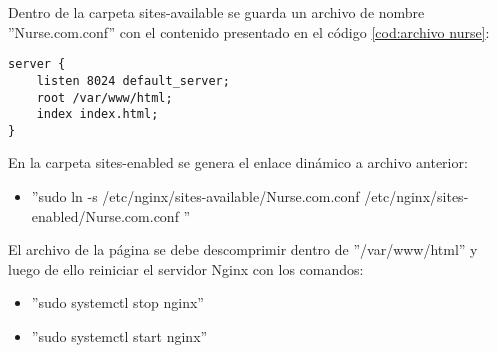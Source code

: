 \pagebreak
Dentro de la carpeta sites-available se guarda un archivo de nombre ''Nurse.com.conf'' con el contenido presentado en el código \ref{cod:archivo nurse}:

\begin{lstlisting}[label=cod:archivo nurse,caption=Archivo /etc/nginx/sites-available/Nurse.com.conf.]
server {
	listen 8024 default_server;
	root /var/www/html;
	index index.html;
}
\end{lstlisting}

En la carpeta sites-enabled se genera el enlace dinámico a archivo anterior:
\begin{itemize}
\item ''sudo ln -s /etc/nginx/sites-available/Nurse.com.conf /etc/nginx/sites-enabled/Nurse.com.conf ''
\end{itemize}

El archivo de la página se debe descomprimir dentro de ''/var/www/html'' y luego de ello reiniciar el servidor Nginx con los comandos:
\begin{itemize}
\item ''sudo systemctl stop nginx'' 
\item ''sudo systemctl start nginx''
\end{itemize}






